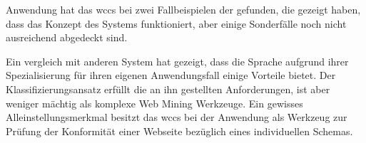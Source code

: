     Anwendung hat das \gls{wccs} bei zwei Fallbeispielen der {\fernUni} gefunden,
    die gezeigt haben, dass das Konzept des Systems funktioniert,
    aber einige Sonderfälle noch nicht ausreichend abgedeckt sind.

    Ein vergleich mit anderen System hat gezeigt,
    dass die Sprache aufgrund ihrer Spezialisierung für ihren eigenen
    Anwendungsfall einige Vorteile bietet.
    Der Klassifizierungsansatz erfüllt die an ihn gestellten Anforderungen,
    ist aber weniger mächtig als komplexe Web Mining Werkzeuge.
    Ein gewisses Alleinstellungsmerkmal besitzt das \gls{wccs}
    bei der Anwendung als Werkzeug zur Prüfung der Konformität
    einer Webseite bezüglich eines individuellen Schemas.